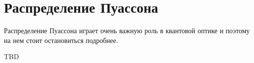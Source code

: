 \section{Распределение Пуассона}

Распределение Пуассона играет очень важную роль в квантовой оптике и
поэтому на нем стоит остановиться подробнее.

\begin{definition}
\end{definition}

TBD


